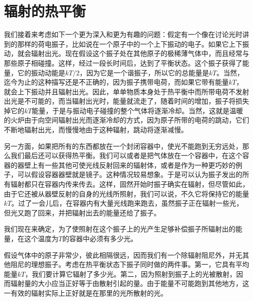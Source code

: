 \section{辐射的热平衡}

我们接着来考虑如下一个更为深入和更为有趣的问题：假定有一个像在讨论光时讲到的那样的荷电振子，比如说在一个原子中的一个上下振动的电子。如果它上下振动，就会辐射出光。现在假设这个振子处在其他原子的极稀薄气体中，而且经常与那些原子相碰撞。这样，经过一段长时间后，达到了平衡状态。这个振子获得了能量，它的振动动能是$kT/2$，因为它是一个谐振子，所以它的总能量是$kT$。当然，迄今为止的这种描写还是不正确的，因为振子携带电荷，而如果它带有能量$kT$，就会上下振动并且辐射出光。因此，单单物质本身处于热平衡中而所带电荷不发射出光是不可能的，而当辐射出光时，能量就流走了，随着时间的增加，振子将损失掉它的$kT$能量，于是与振动电子碰撞的整个气体将逐渐冷却。当然，这就是温暖的火炉由于向空间辐射出光而逐渐冷却的方式，因为原子所带的电荷的跳动，它们不断地辐射出光，而慢慢地由于这种辐射，跳动将逐渐减慢。

另一方面，如果把所有的东西都放在一个封闭容器中，使光不能跑到无穷远处，那么我们最后还可以获得热平衡。我们可以或者是把气体放在一个容器中，在这个容器的器壁上有一些其他可使光线反射回来的辐射体，或者是作为一种更巧妙的例子，可以假设容器器壁就是镜子。这种情况较易想象。于是可以认为振子发出的所有辐射都只在容器内传来传去。这样，固然开始时振子确实在辐射，但尽管如此，由于它还被从器壁反射的自身的光线所照射，我们可以说，不久它将保持它的能量$kT$。过了一会儿后，在容器内有大量光线跑来跑去，虽然振子正在辐射一些光，但光又跑了回来，并把辐射出去的能量还给了振子。

我们现在来确定，为了使照射在这个振子上的光产生足够补偿振子所辐射出的能量，在这个温度为$T$的容器中必须有多少光。

假设气体中的原子非常少，彼此相隔很远，因而我们有一个除辐射阻尼外，并无其他阻尼的理想振子。考虑在热平衡状态下振子同时做的两件事。第一，它具有平均能量$kT$，我们要计算它辐射了多少光。第二，因为照射到振子上的光被散射，因而辐射量的大小应当正好等于由散射引起的量。由于能量不可能跑到其他地方，这一有效的辐射实际上正好就是在那里的光所散射的光。

